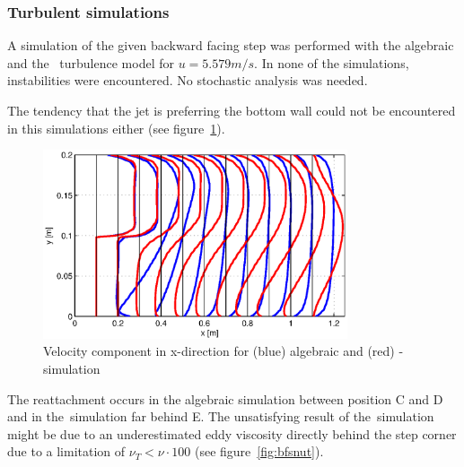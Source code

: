 \clearpage
\subsubsection*{Turbulent simulations}

A simulation of the given backward facing step was performed with the algebraic and the \ke\, turbulence model for $u=5.579m/s$. In none of the simulations, instabilities were encountered. No stochastic analysis was needed.

\noii The tendency that the jet is preferring the bottom wall could not be encountered in this simulations either (see figure~\ref{fig:bfsprofile}).

\begin{figure}[!htb]
\centering
\includegraphics[trim=0 0 0 0,clip,width=0.8\textwidth]{FIGURES/bfs-profile.eps}
\caption{Velocity component in x-direction for (blue) algebraic and (red) \ke-simulation}
\label{fig:bfsprofile}
\end{figure} 



\noii The reattachment occurs in the algebraic simulation between position C and D and in the \ke\,simulation far behind E. The unsatisfying result of the \ke\,simulation might be due to an underestimated eddy viscosity directly behind the step corner due to a limitation of $\nu_T<\nu\cdot 100$ (see figure~\ref{fig:bfsnut}).

